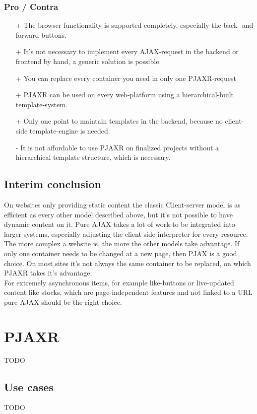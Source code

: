 \documentclass[f,bachelor,binding,twoside,palatino]{WeSTthesis}
\def \ajax {AJAX}
\def \pjax {PJAX}
\def \pjaxr {PJAXR}
\def \pjaxrRequest {PJAXR-request}
\begin{document}
    \subsubsection{Pro / Contra}
      \begin{itemize}
  	    \item[+]{The browser functionality is supported completely, especially the back- and forward-buttons.}
  	    \item[+]{It's not necessary to implement every \ajax{}-request in the backend or  frontend by hand, a generic solution is possible.}
  	    \item[+]{You can replace every container you need in only one \pjaxrRequest{}}
  	    \item[+]{\pjaxr{} can be used on every web-platform using a hierarchical-built template-system.}
  	    \item[+]{Only one point to maintain templates in the backend, because no client-side template-engine is needed.}
        \item[-]{It is not affordable to use \pjaxr{} on finalized projects without a hierarchical template structure, which is necessary.}
      \end{itemize}


  \subsection{Interim conclusion}
  On websites only providing static content the classic Client-server model is as efficient as every other model described above, but it's not possible to have dynamic content on it.
  Pure \ajax{} takes a lot of work to be integrated into larger systems, especially adjusting the client-side interpreter for every resource. The more complex a website is, the more the other models take advantage. If only one container needs to be changed at a new page, then \pjax{} is a good choice. On most sites it's not always the same container to be replaced, on which \pjaxr{} takes it's advantage.\\
  For extremely asynchronous items, for example like-buttons or live-updated content like stocks, which are page-independent features and not linked to a URL pure \ajax{} should be the right choice.

\section{\pjaxr{}}
  TODO
  
  \subsection{Use cases}
  TODO
  
\end{document}
